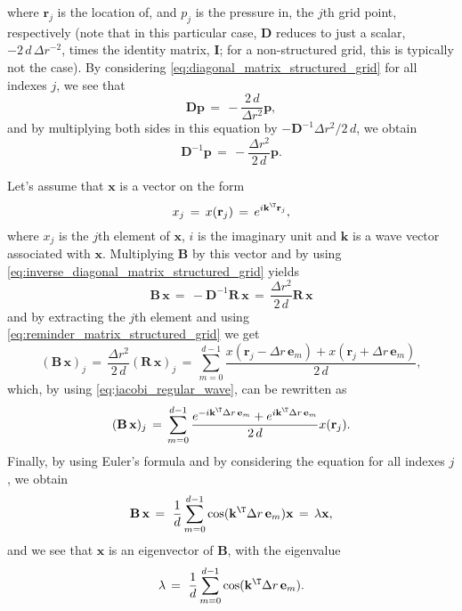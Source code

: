 %
where $\mathbf{r}_j$ is the location of, and $p_j$ is the pressure in, the $j$th grid point, respectively (note that in this particular case, $\mathbf{D}$ reduces to just a scalar, $-2\,d\,\Delta r^{-2}$, times the identity matrix, $\mathbf{I}$; for a non-structured grid, this is typically not the case). By considering \eqref{eq:diagonal_matrix_structured_grid} for all indexes $j$, we see that
%
\begin{equation}
\mathbf{D}\mathbf{p} \,=\, -\frac{2\,d}{\Delta r^2}\mathbf{p},
\end{equation}
%
and by multiplying both sides in this equation by $-\mathbf{D}^{-1}\Delta r^2/2\,d$, we obtain
%
\begin{equation} \label{eq:inverse_diagonal_matrix_structured_grid}
\mathbf{D}^{-1}\mathbf{p} \,=\, -\frac{\Delta r^2}{2\,d}\mathbf{p}.
\end{equation}

Let's assume that $\mathbf{x}$ is a vector on the form
%
\begin{equation} \label{eq:jacobi_regular_wave}
x_j \,=\, x(\mathbf{r}_j) \,=\, e^{i\mathbf{k}^{\T}\mathbf{r}_j},
\end{equation}
%
where $x_j$ is the $j$th element of $\mathbf{x}$, $i$ is the imaginary unit and $\mathbf{k}$ is a wave vector associated with $\mathbf{x}$. Multiplying $\mathbf{B}$ by this vector and by using \eqref{eq:inverse_diagonal_matrix_structured_grid} yields
%
\begin{equation}
\mathbf{B}\,\mathbf{x} \,=\, -\mathbf{D}^{-1}\mathbf{R}\,\mathbf{x} \,=\, \frac{\Delta r^2}{2\,d}\mathbf{R}\,\mathbf{x}
\end{equation}
%
and by extracting the $j$th element and using \eqref{eq:reminder_matrix_structured_grid} we get
%
\begin{equation}
(\mathbf{B}\,\mathbf{x})_j \,=\, \frac{\Delta r^2}{2\,d}(\mathbf{R}\,\mathbf{x})_j \,=\, \sum_{m=0}^{d-1} \frac{x(\mathbf{r}_j-\Delta r\,\mathbf{e}_m)+x(\mathbf{r}_j+\Delta r\,\mathbf{e}_m)}{2\,d},
\end{equation}
%
which, by using \eqref{eq:jacobi_regular_wave}, can be rewritten as
%
\begin{equation}
(\mathbf{B}\,\mathbf{x})_j \,=\, \sum_{m=0}^{d-1} \frac{e^{-i\mathbf{k}^{\T}\Delta r\,\mathbf{e}_m}+e^{i\mathbf{k}^{\T}\Delta r\,\mathbf{e}_m}}{2\,d}x(\mathbf{r}_j).
\end{equation}
%
Finally, by using Euler's formula and by considering the equation for all indexes $j$, we obtain
%
\begin{equation} \label{eq:jacobian_error_eigenvector_equation_solved}
\mathbf{B}\,\mathbf{x} \,=\ \frac{1}{d}\sum_{m=0}^{d-1} \cos(\mathbf{k}^{\T}\Delta r\,\mathbf{e}_m) \mathbf{x}\, =\, \lambda\mathbf{x},
\end{equation}
%
and we see that $\mathbf{x}$ is an eigenvector of $\mathbf{B}$, with the eigenvalue
%
\begin{equation} \label{eq:jacobian_b_eigenvalue}
\lambda \,=\ \frac{1}{d}\sum_{m=0}^{d-1} \cos(\mathbf{k}^{\T}\Delta r\,\mathbf{e}_m).
\end{equation}

